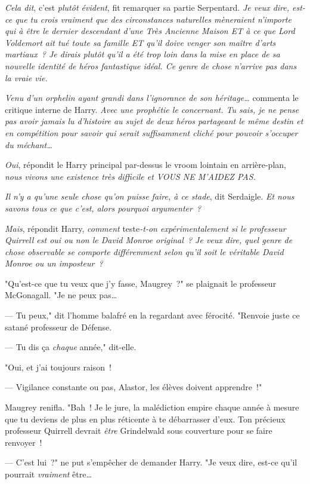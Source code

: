 \emph{Cela dit}, c'est \emph{plutôt évident}, fit remarquer sa partie Serpentard. \emph{Je veux dire, est-ce que tu crois vraiment que des circonstances naturelles mèneraient n'importe qui à être le dernier descendant d'une Très Ancienne Maison ET à ce que Lord Voldemort ait tué toute sa famille ET qu'il doive venger son maître d'arts martiaux~? Je dirais plutôt qu'il a été trop loin dans la mise en place de sa nouvelle identité de héros fantastique idéal. Ce genre de chose n'arrive pas dans la vraie vie.}

\emph{Venu d'un orphelin ayant grandi dans l'ignorance de son héritage…} commenta le critique interne de Harry. \emph{Avec une prophétie le concernant. Tu sais, je ne pense pas avoir jamais lu d'histoire au sujet de deux héros partageant le même destin et en compétition pour savoir qui serait suffisamment cliché pour pouvoir s'occuper du méchant…}

\emph{Oui}, répondit le Harry principal par-dessus le vroom lointain en arrière-plan, \emph{nous vivons une existence très difficile et VOUS NE M'AIDEZ PAS.}

\emph{Il n'y a qu'une seule chose qu'on puisse faire, à ce stade}, dit Serdaigle. \emph{Et nous savons tous ce que c'est, alors pourquoi argumenter~?}

\emph{Mais}, répondit Harry, \emph{comment} teste\emph{-t-on expérimentalement si le professeur Quirrell est oui ou non le David Monroe original~? Je veux dire, quel genre de chose observable se comporte différemment selon qu'il soit le véritable David Monroe ou un imposteur~?}

"Qu'est-ce que tu veux que j'y fasse, Maugrey~?" se plaignait le professeur McGonagall. "Je ne peux pas…

--- Tu peux," dit l'homme balafré en la regardant avec férocité. "Renvoie juste ce satané professeur de Défense.

--- Tu dis ça \emph{chaque} année," dit-elle.

"Oui, et j'ai toujours raison~!

--- Vigilance constante ou pas, Alastor, les élèves doivent apprendre~!"

Maugrey renifla. "Bah~! Je le jure, la malédiction empire chaque année à mesure que tu deviens de plus en plus réticente à te débarrasser d'eux. Ton précieux professeur Quirrell devrait \emph{être} Grindelwald sous couverture pour se faire renvoyer~!

--- C'est lui~?" ne put s'empêcher de demander Harry. "Je veux dire, est-ce qu'il pourrait \emph{vraiment} être…

